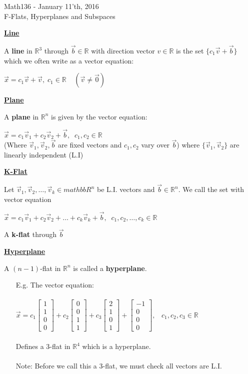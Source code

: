 \documentclass{letter}
\newcommand{\0}[1]{\begin{bmatrix}#1\end{bmatrix}}
\newcommand{\h}[1]{\underline{\textbf{#1}}}
\begin{document}
	\begin{center}
		\LARGE Math136 - January 11'th, 2016\\
		\large F-Flats, Hyperplanes and Subspaces
	\end{center}
	\vspace{0.25 in}
	
	\h{Line}
	
	A \textbf{line} in $\mathbb{R}^3$ through $\vec b \in \mathbb{R}$ with direction vector $v \in \mathbb{R}$ is the set $\{ c_1\vec v + \vec b \}$ which we often write as a vector equation:
	
	$\vec x = c_1 \vec v + \vec v,\; c_1 \in \mathbb{R} \;\;\;\;(\vec v \neq \vec 0)$
	
	\h{Plane} 
	
	A \textbf{plane} in $\mathbb{R}^n$ is given by the vector equation:
	
	$\vec x = c_1 \vec v_1 + c_2 \vec v_2 + \vec b,\;\;c_1, c_2 \in \mathbb{R}$\\
	(Where $\vec v_1, \vec v_2, \vec b$ are fixed vectors and $c_1, c_2$ vary over $\vec b$) where $\{ \vec v_1, \vec v_2 \}$ are linearly independent (L.I) 
	
	\h{K-Flat}
	
	Let $\vec v_1, \vec v_2, \dots, \vec v_k \in mathbb{R}^n$ be L.I. vectors and $\vec b \in \mathbb{R}^n$. We call the set with vector equation
	
	$\vec x = c_1 \vec v_1 + c_2 \vec v_2 + \dots + c_k \vec v_k + \vec b,\;\;c_1, c_2, \dots, c_k \in \mathbb{R}$
	
	A \textbf{k-flat} through $\vec b$
	
	\h{Hyperplane}
	
	A $(n-1)$-flat in $\mathbb{R}^n$ is called a \textbf{hyperplane}.
	
	\begin{itemize}
		\item[E.g.] The vector equation:\\\\
		$\vec x = c_1 \0{1\\1\\0\\0} + c_2\0{0\\0\\1\\1} + c_3\0{2\\1\\0\\1} + \0{-1\\0\\0\\0},\;\;\;c_1, c_2, c_3 \in \mathbb{R}$\\\\
		Defines a 3-flat in $\mathbb{R}^4$ which is a hyperplane.\\\\
		Note: Before we call this a 3-flat, we must check all vectors are L.I.
	\end{itemize}
	
\end{document}
